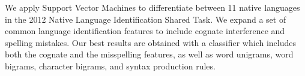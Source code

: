 We apply Support Vector Machines to differentiate between 11 native languages in the
 2012 Native Language Identification Shared
 Task. We expand a set of common language
 identification features to include cognate interference
 and spelling mistakes. Our best results
 are obtained with a classifier which includes
 both the cognate and the misspelling features,
 as well as word unigrams, word bigrams, character
 bigrams, and syntax production rules.

